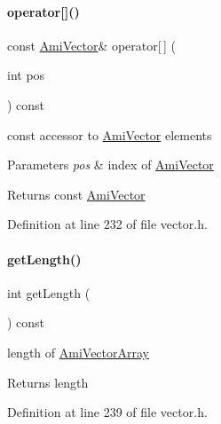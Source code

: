 \paragraph{\texorpdfstring{operator[]()}{operator[]()}\hspace{0.1cm}{\footnotesize\ttfamily [2/2]}}
{\footnotesize\ttfamily const \mbox{\hyperlink{classamici_1_1_ami_vector}{Ami\+Vector}}\& operator\mbox{[}$\,$\mbox{]} (\begin{DoxyParamCaption}\item[{int}]{pos }\end{DoxyParamCaption}) const}

const accessor to \mbox{\hyperlink{classamici_1_1_ami_vector}{Ami\+Vector}} elements 
\begin{DoxyParams}{Parameters}
{\em pos} & index of \mbox{\hyperlink{classamici_1_1_ami_vector}{Ami\+Vector}} \\
\hline
\end{DoxyParams}
\begin{DoxyReturn}{Returns}
const \mbox{\hyperlink{classamici_1_1_ami_vector}{Ami\+Vector}} 
\end{DoxyReturn}


Definition at line 232 of file vector.\+h.

\mbox{\label{classamici_1_1_ami_vector_array_a5f00d4dc3e7866d193ce926f35542801}} 
\paragraph{\texorpdfstring{get\+Length()}{getLength()}}
{\footnotesize\ttfamily int get\+Length (\begin{DoxyParamCaption}{ }\end{DoxyParamCaption}) const}

length of \mbox{\hyperlink{classamici_1_1_ami_vector_array}{Ami\+Vector\+Array}} \begin{DoxyReturn}{Returns}
length 
\end{DoxyReturn}


Definition at line 239 of file vector.\+h.

